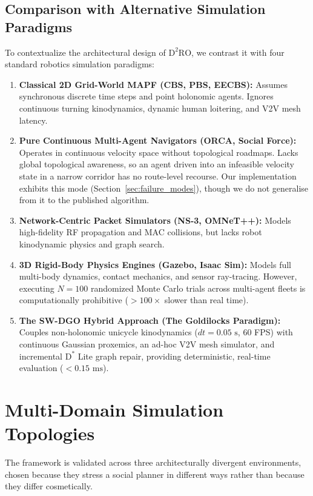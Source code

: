 \documentclass[journal]{IEEEtran}
\begin{document}
\subsection{Comparison with Alternative Simulation Paradigms}
To contextualize the architectural design of $\text{D}^2\text{RO}$, we contrast it with four standard robotics simulation paradigms:
\begin{enumerate}
    \item \textbf{Classical 2D Grid-World MAPF (CBS, PBS, EECBS):} Assumes synchronous discrete time steps and point holonomic agents. Ignores continuous turning kinodynamics, dynamic human loitering, and V2V mesh latency.
    \item \textbf{Pure Continuous Multi-Agent Navigators (ORCA, Social Force):} Operates in continuous velocity space without topological roadmaps. Lacks global topological awareness, so an agent driven into an infeasible velocity state in a narrow corridor has no route-level recourse. Our implementation exhibits this mode (Section~\ref{sec:failure_modes}), though we do not generalise from it to the published algorithm.
    \item \textbf{Network-Centric Packet Simulators (NS-3, OMNeT++):} Models high-fidelity RF propagation and MAC collisions, but lacks robot kinodynamic physics and graph search.
    \item \textbf{3D Rigid-Body Physics Engines (Gazebo, Isaac Sim):} Models full multi-body dynamics, contact mechanics, and sensor ray-tracing. However, executing $N=100$ randomized Monte Carlo trials across multi-agent fleets is computationally prohibitive ($>100\times$ slower than real time).
    \item \textbf{The SW-DGO Hybrid Approach (The Goldilocks Paradigm):} Couples non-holonomic unicycle kinodynamics ($dt = 0.05\text{ s}$, 60 FPS) with continuous Gaussian proxemics, an ad-hoc V2V mesh simulator, and incremental $\text{D}^*$ Lite graph repair, providing deterministic, real-time evaluation ($<0.15\text{ ms}$).
\end{enumerate}

\section{Multi-Domain Simulation Topologies}
The framework is validated across three architecturally divergent environments,
chosen because they stress a social planner in different ways rather than because
they differ cosmetically.
\end{document}
